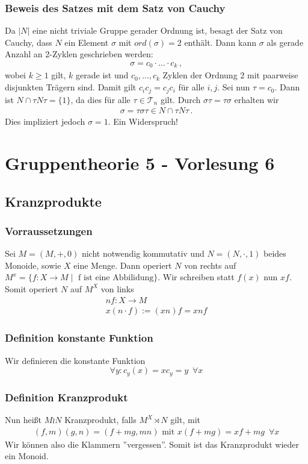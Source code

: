\documentclass[12pt, german]{article}
\begin{document}
	\subsubsection{Beweis des Satzes mit dem Satz von Cauchy}
	Da $|N|$ eine nicht triviale Gruppe gerader Ordnung ist, besagt der Satz von Cauchy, dass $N$ ein Element $\sigma$ mit $ord(\sigma) = 2$ enthält. 
	Dann kann $\sigma$ als gerade Anzahl an 2-Zyklen geschrieben werden:
	\begin{align*}
		\sigma = c_0 \cdot \ldots \cdot c_k\, ,
	\end{align*} 
	wobei $k\geq 1$ gilt, $k$ gerade ist und $c_0, \ldots, c_k$ Zyklen der Ordnung $2$ mit paarweise disjunkten Trägern sind. Damit gilt $c_ic_j = c_jc_i$ für alle $i,j$. 
	Sei nun $\tau = c_0$. Dann ist $N \cap \tau N \tau = \{1\}$, da dies für alle $\tau \in \mathcal T_n$ gilt. Durch $\sigma\tau = \tau \sigma$ erhalten wir
	\begin{align*}
		\sigma = \tau\sigma\tau \in N\cap \tau N \tau\, .
	\end{align*} 
	Dies impliziert jedoch $\sigma = 1$. Ein Widerspruch! 
	
	\section{Gruppentheorie 5 - Vorlesung 6}
	\subsection{Kranzprodukte}
	\subsubsection{Vorraussetzungen}
	Sei $M = (M, +, 0)$ nicht notwendig kommutativ und $N=(N, \cdot, 1)$ beides Monoide, sowie $X$ eine Menge. 
	Dann operiert $N$ von rechts auf $M^x = \{ f: X \to M \mid \text{ f ist eine Abbilidung} \}$. Wir schreiben statt $f(x)$ nun $xf$. 
	Somit operiert $N$ auf $M^X$ von links 
	\begin{align*}
		nf : X \to M \\ 
		x(n\cdot f) := (xn)f = xnf 
	\end{align*}
	\subsubsection{Definition konstante Funktion}
	Wir definieren die konstante Funktion	$$\forall y:  c_y(x) = xc_y = y \, \, \, \forall x$$ 
	
	\subsubsection{Definition Kranzprodukt}
	Nun heißt $M \wr N$ Kranzprodukt, falls $M^X \rtimes N$ gilt, mit 
	\begin{align*}
		(f,m)(g,n) = (f + mg, mn) \text{ mit } x(f+mg) = xf + mg \, \, \, \forall x
	\end{align*}
	Wir können also die Klammern ''vergessen''. Somit ist das Kranzprodukt wieder ein Monoid.
	
\end{document}
